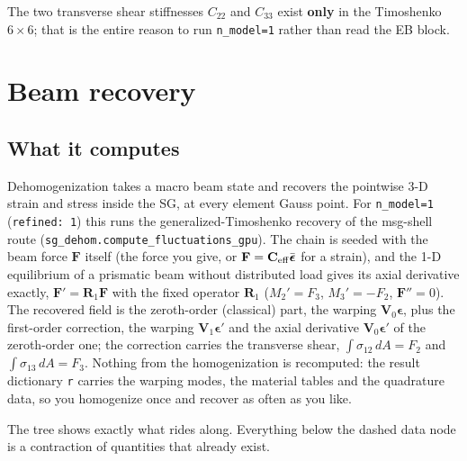 The two transverse shear stiffnesses $C_{22}$ and $C_{33}$ exist \textbf{only}
in the Timoshenko $6\times6$; that is the entire reason to run
\texttt{n\_model=1} rather than read the EB block.

\section{Beam recovery}
\label{sec:solid-beamdehom}

\subsection{What it computes}

Dehomogenization takes a macro beam state and recovers the pointwise 3-D strain
and stress inside the SG, at every element Gauss point. For \texttt{n\_model=1}
(\texttt{refined: 1}) this runs the generalized-Timoshenko recovery of the
msg-shell route (\texttt{sg\_dehom.compute\_fluctuations\_gpu}). The chain is
seeded with the beam force $\mathbf{F}$ itself (the force you give, or
$\mathbf{F} = \mathbf{C}_{\rm eff}\bar{\boldsymbol{\epsilon}}$ for a strain),
and the 1-D equilibrium of a prismatic beam without distributed load gives its
axial derivative exactly, $\mathbf{F}' = \mathbf{R}_1\mathbf{F}$ with the fixed
operator $\mathbf{R}_1$ ($M_2' = F_3$, $M_3' = -F_2$, $\mathbf{F}'' = 0$). The
recovered field is the zeroth-order (classical) part, the warping
$\mathbf{V}_0\boldsymbol{\epsilon}$, plus the first-order correction, the warping
$\mathbf{V}_1\boldsymbol{\epsilon}'$ and the axial derivative
$\mathbf{V}_0\boldsymbol{\epsilon}'$ of the zeroth-order one; the correction
carries the transverse shear, $\int\sigma_{12}\,dA = F_2$ and
$\int\sigma_{13}\,dA = F_3$. Nothing from the homogenization is recomputed: the
result dictionary \texttt{r} carries the warping modes, the material tables and
the quadrature data, so you homogenize once and recover as often as you like.

The tree shows exactly what rides along. Everything below the dashed data node
is a contraction of quantities that already exist.

